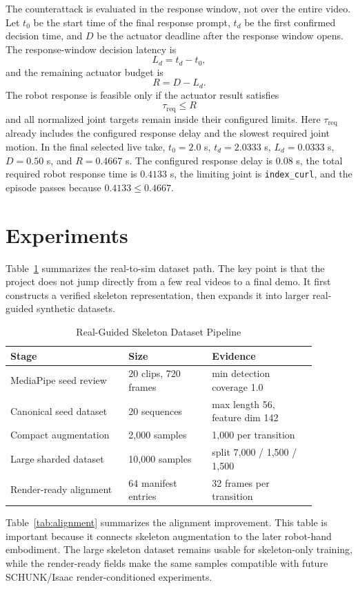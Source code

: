 \documentclass[conference]{IEEEtran}
\begin{document}
The counterattack is evaluated in the response window, not over the entire video. Let $t_0$ be the start time of the final response prompt, $t_d$ be the first confirmed decision time, and $D$ be the actuator deadline after the response window opens. The response-window decision latency is
\[
L_d = t_d - t_0,
\]
and the remaining actuator budget is
\[
R = D - L_d.
\]
The robot response is feasible only if the actuator result satisfies
\[
\tau_{\mathrm{req}} \le R
\]
and all normalized joint targets remain inside their configured limits. Here $\tau_{\mathrm{req}}$ already includes the configured response delay and the slowest required joint motion. In the final selected live take, $t_0=2.0$ s, $t_d=2.0333$ s, $L_d=0.0333$ s, $D=0.50$ s, and $R=0.4667$ s. The configured response delay is $0.08$ s, the total required robot response time is $0.4133$ s, the limiting joint is \texttt{index\_curl}, and the episode passes because $0.4133 \le 0.4667$.

\section{Experiments}

Table~\ref{tab:dataset} summarizes the real-to-sim dataset path. The key point is that the project does not jump directly from a few real videos to a final demo. It first constructs a verified skeleton representation, then expands it into larger real-guided synthetic datasets.

\begin{table}[t]
\caption{Real-Guided Skeleton Dataset Pipeline}
\label{tab:dataset}
\centering
\scriptsize
\begin{tabular}{p{0.34\linewidth}p{0.24\linewidth}p{0.30\linewidth}}
\hline
Stage & Size & Evidence \\
\hline
MediaPipe seed review & 20 clips, 720 frames & min detection coverage 1.0 \\
Canonical seed dataset & 20 sequences & max length 56, feature dim 142 \\
Compact augmentation & 2,000 samples & 1,000 per transition \\
Large sharded dataset & 10,000 samples & split 7,000 / 1,500 / 1,500 \\
Render-ready alignment & 64 manifest entries & 32 frames per transition \\
\hline
\end{tabular}
\end{table}

Table~\ref{tab:alignment} summarizes the alignment improvement. This table is important because it connects skeleton augmentation to the later robot-hand embodiment. The large skeleton dataset remains usable for skeleton-only training, while the render-ready fields make the same samples compatible with future SCHUNK/Isaac render-conditioned experiments.
\end{document}
